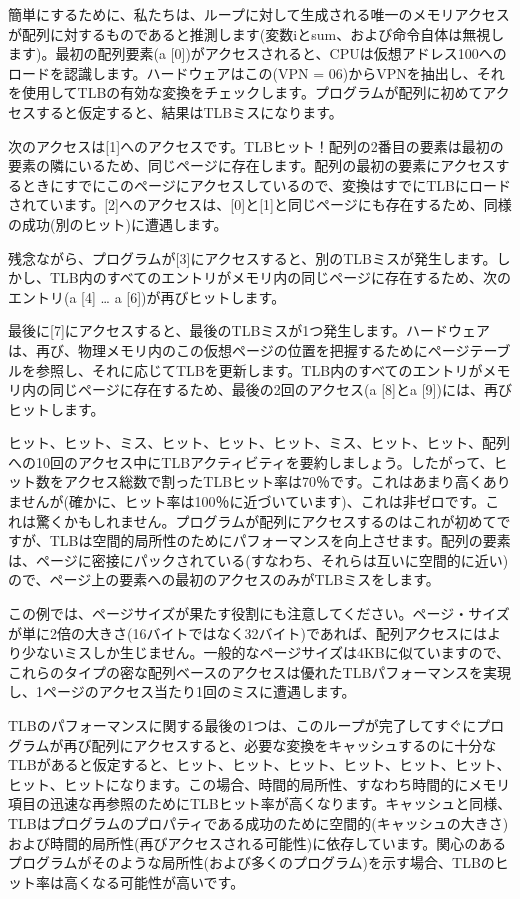 簡単にするために、私たちは、ループに対して生成される唯一のメモリアクセスが配列に対するものであると推測します(変数iとsum、および命令自体は無視します)。最初の配列要素(a
{[}0{]})がアクセスされると、CPUは仮想アドレス100へのロードを認識します。ハードウェアはこの(VPN
=
06)からVPNを抽出し、それを使用してTLBの有効な変換をチェックします。プログラムが配列に初めてアクセスすると仮定すると、結果はTLBミスになります。

次のアクセスは{[}1{]}へのアクセスです。TLBヒット！配列の2番目の要素は最初の要素の隣にいるため、同じページに存在します。配列の最初の要素にアクセスするときにすでにこのページにアクセスしているので、変換はすでにTLBにロードされています。{[}2{]}へのアクセスは、{[}0{]}と{[}1{]}と同じページにも存在するため、同様の成功(別のヒット)に遭遇します。

残念ながら、プログラムが{[}3{]}にアクセスすると、別のTLBミスが発生します。しかし、TLB内のすべてのエントリがメモリ内の同じページに存在するため、次のエントリ(a
{[}4{]} \ldots{} a {[}6{]})が再びヒットします。

最後に{[}7{]}にアクセスすると、最後のTLBミスが1つ発生します。ハードウェアは、再び、物理メモリ内のこの仮想ページの位置を把握するためにページテーブルを参照し、それに応じてTLBを更新します。TLB内のすべてのエントリがメモリ内の同じページに存在するため、最後の2回のアクセス(a
{[}8{]}とa {[}9{]})には、再びヒットします。

ヒット、ヒット、ミス、ヒット、ヒット、ヒット、ミス、ヒット、ヒット、配列への10回のアクセス中にTLBアクティビティを要約しましょう。したがって、ヒット数をアクセス総数で割ったTLBヒット率は70％です。これはあまり高くありませんが(確かに、ヒット率は100％に近づいています)、これは非ゼロです。これは驚くかもしれません。プログラムが配列にアクセスするのはこれが初めてですが、TLBは空間的局所性のためにパフォーマンスを向上させます。配列の要素は、ページに密接にパックされている(すなわち、それらは互いに空間的に近い)ので、ページ上の要素への最初のアクセスのみがTLBミスをします。

この例では、ページサイズが果たす役割にも注意してください。ページ・サイズが単に2倍の大きさ(16バイトではなく32バイト)であれば、配列アクセスにはより少ないミスしか生じません。一般的なページサイズは4KBに似ていますので、これらのタイプの密な配列ベースのアクセスは優れたTLBパフォーマンスを実現し、1ページのアクセス当たり1回のミスに遭遇します。

TLBのパフォーマンスに関する最後の1つは、このループが完了してすぐにプログラムが再び配列にアクセスすると、必要な変換をキャッシュするのに十分なTLBがあると仮定すると、ヒット、ヒット、ヒット、ヒット、ヒット、ヒット、ヒット、ヒットになります。この場合、時間的局所性、すなわち時間的にメモリ項目の迅速な再参照のためにTLBヒット率が高くなります。キャッシュと同様、TLBはプログラムのプロパティである成功のために空間的(キャッシュの大きさ)および時間的局所性(再びアクセスされる可能性)に依存しています。関心のあるプログラムがそのような局所性(および多くのプログラム)を示す場合、TLBのヒット率は高くなる可能性が高いです。

